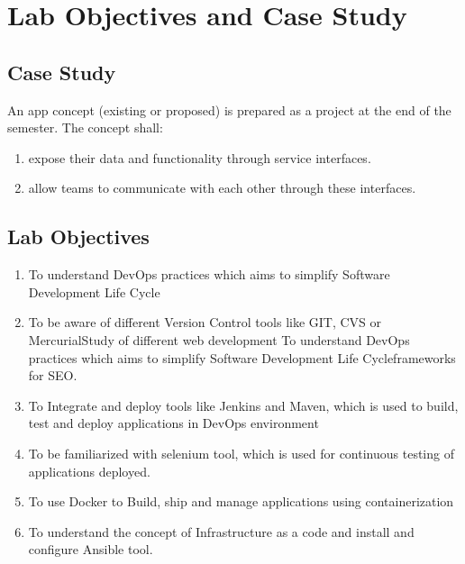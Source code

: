 


\section{Lab Objectives and Case Study}
\subsection{Case Study}

An app concept (existing or proposed) is prepared as a project at the end of the semester. The concept shall:
\begin{enumerate}
    \item expose their data and functionality through service interfaces.
    \item allow teams to communicate with each other through these interfaces.
\end{enumerate}

\subsection{Lab Objectives}
\begin{enumerate}
    \item  To understand DevOps practices which aims to simplify Software Development Life Cycle
    \item To be aware of different Version Control tools like GIT, CVS or MercurialStudy of different web development To understand DevOps practices which aims to simplify Software Development Life Cycleframeworks for SEO.
    \item To Integrate and deploy tools like Jenkins and Maven, which is used to build, test and deploy applications in DevOps environment
    \item To be familiarized with selenium tool, which is used for continuous testing of applications deployed.
    \item To use Docker to Build, ship and manage applications using containerization
    \item To understand the concept of Infrastructure as a code and install and configure Ansible tool.

\end{enumerate}
